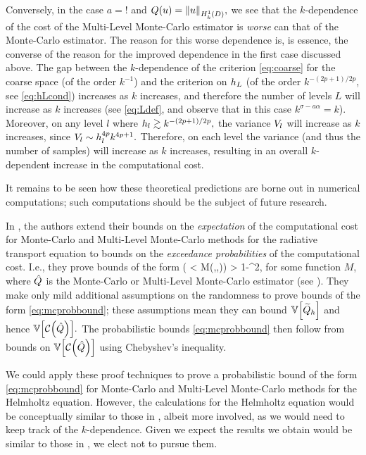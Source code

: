Conversely, in the case  $a=!$ and $Q(u) = \NHokD{u},$ we see that the $k$-dependence of the cost of the Multi-Level Monte-Carlo estimator is \emph{worse} can that of the Monte-Carlo estimator. The reason for this worse dependence is, is essence, the converse of the reason for the improved dependence in the first case discussed above. The gap between the $k$-dependence of the criterion \cref{eq:coarse} for the coarse space (of the order $k^{-1}$) and the criterion on $h_{L}$ (of the order $k^{-(2p+1)/2p}$, see \cref{eq:hLcond}) increases as $k$ increases, and therefore the number of levels $L$ will increase as $k$ increases (see \cref{eq:Ldef}, and observe that in this case $k^{\sigma - a\alpha} = k$). Moreover, on any level $l$ where $h_{l} \gtrsim k^{-(2p+1)/2p},$ the variance $V_{l}$ will increase as $k$ increases, since $V_{l} \sim h_{l}^{4p}k^{4p+1}.$ Therefore, on each level the variance (and thus the number of samples) will increase as $k$ increases, resulting in an overall $k$-dependent increase in the computational cost.

It remains to be seen how these theoretical predictions are borne out in numerical computations; such computations should be the subject of future research.


In \cite{GrPaSc:19}, the authors extend their bounds on the \emph{expectation} of the computational cost for Monte-Carlo and Multi-Level Monte-Carlo methods for the radiative transport equation to bounds on the \emph{exceedance probabilities} of the computational cost. I.e., they prove bounds of the form
\beq\label{eq:mcprobbound}
\PP\mleft(\Cost{\Qhat} < M(\eps,\delta,\Qhat)\mright) > 1-\delta^2,
\eeq
for some function $M$, where $\hat{Q}$ is the Monte-Carlo or Multi-Level Monte-Carlo estimator (see \cite[Theorems 5.12 and 5.13]{GrPaSc:19}). They make only mild additional assumptions on the randomness to prove bounds of the form \cref{eq:mcprobbound}; these assumptions mean they can bound $\VAR{\Qhtilde}$ and hence $\VAR{\Cost{\Qhat}}.$ The probabilistic bounds \cref{eq:mcprobbound} then follow from bounds on $\VAR{\Cost{\Qhat}}$ using Chebyshev's inequality.

We could apply these proof techniques to prove a probabilistic bound of the form \cref{eq:mcprobbound} for Monte-Carlo and Multi-Level Monte-Carlo methods for the Helmholtz equation. However, the calculations for the Helmholtz equation would be conceptually similar to those in \cite{GrPaSc:19}, albeit more involved, as we would need to keep track of the $k$-dependence. Given we expect the results we obtain would be similar to those in \cite{GrPaSc:19}, we elect not to pursue them.
\ere
